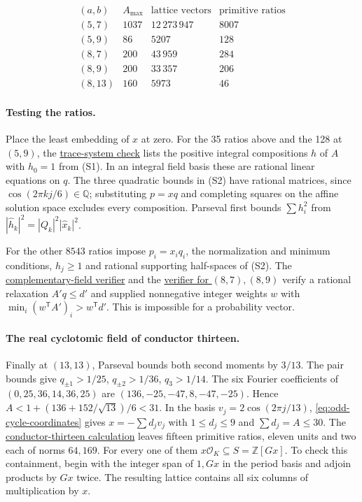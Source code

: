 \documentclass[11pt,reqno]{amsart}
\newcommand{\codecheck}[2]{\href{https://github.com/sebastienpalcoux/grothendieck-ring-classification/blob/d5750105bb5758f3ad38d2e5464dfcc12c019816/supplements/rank6/sphericality/#1}{#2}}
\theoremstyle{remark}\newtheorem{remark}[theorem]{Remark}
\numberwithin{equation}{section}
\begin{document}
\[
\begin{array}{c|r|r|r}
 (a,b)&A_{\max}&\text{lattice vectors}&\text{primitive ratios}\\\hline
 (5,7)&1037&12\,273\,947&8007\\
 (5,9)&86&5207&128\\
 (8,7)&200&43\,959&284\\
 (8,9)&200&33\,357&206\\
 (8,13)&160&5973&46
\end{array}
\]

\paragraph{Testing the ratios.}
Place the least embedding of $x$ at zero. For the 35 ratios above
and the 128 at $(5,9)$, the
\codecheck{sextic_complement/sextic_trace_systems.py}{trace-system check}
lists the positive integral compositions $h$ of $A$ with $h_0=1$
from (S1). In an integral field basis these are rational linear
equations on $q$. The three quadratic bounds in (S2) have rational
matrices, since
$\cos(2\pi kj/6)\in\mathbb Q$; substituting $p=xq$ and completing
squares on the affine solution space excludes every composition.
Parseval first bounds $\sum h_i^2$ from
$|\widehat h_k|^2=|Q_k|^2|\widehat x_k|^2$.

For the other $8543$ ratios impose $p_i=x_iq_i$, the normalization
and minimum conditions, $h_j\ge1$ and rational supporting
half-spaces of (S2). The
\codecheck{sextic_complement/verify_complement.py}{complementary-field verifier}
and the \codecheck{sextic_certificates/verify_sextic.py}{verifier for $(8,7),(8,9)$}
verify a rational relaxation $A'q\le d'$ and supplied nonnegative
integer weights $w$ with $\min_i(w^{\mathsf T}A')_i>w^{\mathsf T}d'$.
This is impossible for a probability vector.

\paragraph{The real cyclotomic field of conductor thirteen.}
Finally at $(13,13)$, Parseval bounds both second moments by $3/13$.
The pair bounds give $q_{\pm1}>1/25$, $q_{\pm2}>1/36$, $q_3>1/14$.
The six Fourier coefficients of $(0,25,36,14,36,25)$ are
$(136,-25,-47,8,-47,-25)$. Hence
$A<1+(136+152/\sqrt{13})/6<31$. In the basis $v_j=2\cos(2\pi j/13)$, \eqref{eq:odd-cycle-coordinates}
gives $x=-\sum d_jv_j$ with $1\le d_j\le9$ and $\sum d_j=A\le30$.
The
\codecheck{sextic_complement/sextic13_descent.py}{conductor-thirteen calculation}
leaves fifteen primitive ratios, eleven units and two each of norms
$64,169$. For every one of them $x\mathcal O_K\subseteq S=\mathbb Z[Gx]$.
To check this containment, begin with the integer span of $1,Gx$ in
the period basis and adjoin products by $Gx$ twice. The resulting
lattice contains all six columns of multiplication by $x$.
\end{document}

